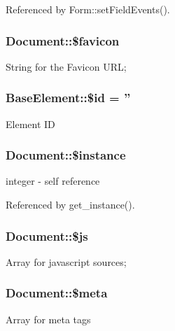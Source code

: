 Referenced by Form::setFieldEvents().

\subsubsection[{\$favicon}]{\setlength{\rightskip}{0pt plus 5cm}Document::\$favicon}\label{classDocument_ad74353c065d3fe06667bc549ed0977e7}
String for the Favicon URL; 
\subsubsection[{\$id}]{\setlength{\rightskip}{0pt plus 5cm}BaseElement::\$id = ''}\label{classBaseElement_a11b6989c43b53869a09f5ce65aa55b45}
Element ID 
\subsubsection[{\$instance}]{\setlength{\rightskip}{0pt plus 5cm}Document::\$instance}\label{classDocument_a2699d681667ea5a811ec6da1bf2a5087}
integer -\/ self reference 

Referenced by get\_\-instance().

\subsubsection[{\$js}]{\setlength{\rightskip}{0pt plus 5cm}Document::\$js}\label{classDocument_aff8d5c694d27719238793df5c3dbe55f}
Array for javascript sources; 
\subsubsection[{\$meta}]{\setlength{\rightskip}{0pt plus 5cm}Document::\$meta}\label{classDocument_a4b2a3fc78ec084611daef3343dca3756}
Array for meta tags 
